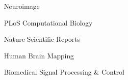 
\fontsize{9pt}{1em}\bodyfontlight\upshape\color{text}
\vspace{2mm}

\begin{cvitems}
    \item {Neuroimage}
    \item {PLoS Computational Biology}
    \item {Nature Scientific Reports}
    \item {Human Brain Mapping}
    \item {Biomedical Signal Processing & Control}
\end{cvitems}

\vspace{2mm}